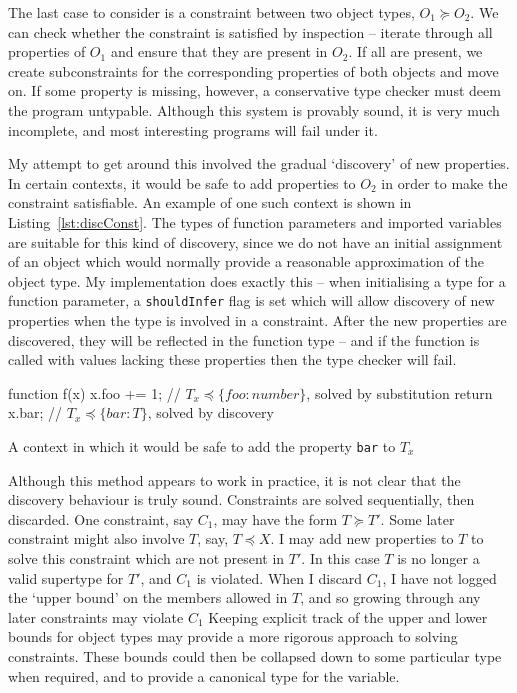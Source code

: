 \documentclass[12pt,a4paper,twoside,openright]{report}
\theoremstyle{definition}
\theoremstyle{dotless}
\newcommand*{\js}{\texttt}
\begin{document}
The last case to consider is a constraint between two object types, $O_1\succeq
O_2$. We can check whether the constraint is satisfied by inspection -- iterate
through all properties of $O_1$ and ensure that they are present in $O_2$. If
all are present, we create subconstraints for the corresponding properties of
both objects and move on.  If some property is missing, however, a conservative
type checker must deem the program untypable. Although this system is provably
sound, it is very much incomplete, and most interesting programs will fail under it.

My attempt to get around this involved the gradual `discovery' of new properties.
In certain contexts, it would be safe to add properties to $O_2$ in order to make the
constraint satisfiable. An example of one such context is shown in Listing~\ref{lst:discConst}.
The types of function parameters and imported variables are suitable for this kind of discovery, since 
we do not have an initial assignment of an object which would normally provide a reasonable
approximation of the object type. My implementation does exactly this -- when initialising a type
for a function parameter, a \js{shouldInfer} flag is set which will allow discovery 
of new properties when the type is involved in a constraint. After the new properties are 
discovered, they will be reflected in the function type -- and if the function is called with 
values lacking these properties then the type checker will fail.

\begin{listing}
  \begin{jscript}
	function f(x) {
	  x.foo += 1;   // $T_x \preceq\{foo:number\}$, solved by substitution
	  return x.bar; // $T_x \preceq\{bar:T\}$, solved by discovery
	}
  \end{jscript}
  \caption{A context in which it would be safe to add the property \js{bar} to $T_x$}
  \label{lst:discConst}
\end{listing}

Although this method appears to work in practice, it is not clear that the
discovery behaviour is truly sound. Constraints are solved sequentially, then
discarded. One constraint, say $C_1$, may have the form $T\succeq T'$. Some
later constraint might also involve $T$, say, $T\preceq X$.  I may add new
properties to $T$ to solve this constraint which are not present in $T'$. In
this case $T$ is no longer a valid supertype for $T'$, and $C_1$ is violated.
When I discard $C_1$, I have not logged the `upper bound' on the members
allowed in $T$, and so growing through any later constraints may violate $C_1$
Keeping explicit track of the upper and lower bounds for object types may
provide a more rigorous approach to solving constraints. These bounds could
then be collapsed down to some particular type when required, and to provide a
canonical type for the variable.
\end{document}
